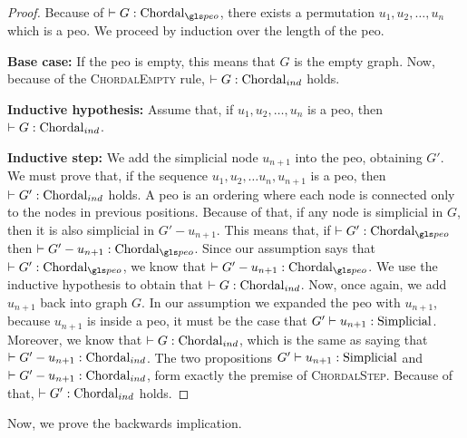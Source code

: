 \begin{proof}
    Because of $\chordalpeo{G}$, there exists a permutation $u_1, u_2, \dots, u_n$ which is a \gls{peo}. We proceed by induction over the length of the \gls{peo}.

    \medskip

    \textbf{Base case:}
    If the \gls{peo} is empty, this means that $G$ is the empty graph. Now, because of the \textsc{ChordalEmpty} rule, $\chordalind{G}$ holds.

    \medskip

    \textbf{Inductive hypothesis:}
    Assume that, if $u_1, u_2, \dots, u_n$ is a \gls{peo}, then $\chordalind{G}$.

    \medskip

    \textbf{Inductive step:}
    We add the simplicial node $u_{n+1}$ into the \gls{peo}, obtaining $G'$. We must prove that, if the sequence $u_1, u_2, \dots u_n, u_{n+1}$ is a \gls{peo}, then $\chordalind{G'}$ holds.
    A \gls{peo} is an ordering where each node is connected only to the nodes in previous positions. Because of that, if any node is simplicial in $G$, then it is also simplicial in $G' - u_{n+1}$. This means that, if $\chordalpeo{G'}$ then $\chordalpeo{G' - u_{n+1}}$. Since our assumption says that $\chordalpeo{G'}$, we know that $\chordalpeo{G' - u_{n+1}}$. We use the inductive hypothesis to obtain that $\chordalind{G}$. Now, once again, we add $u_{n+1}$ back into graph $G$. In our assumption we expanded the \gls{peo} with $u_{n+1}$, because $u_{n+1}$ is inside a \gls{peo}, it must be the case that $\simplicial{u_{n+1}}{G'}$. Moreover, we know that $\chordalind{G}$, which is the same as saying that $\chordalind{G' - u_{n+1}}$. The two propositions $\simplicial{u_{n+1}}{G'}$ and $\chordalind{G' - u_{n+1}}$, form exactly the premise of \textsc{ChordalStep}. Because of that, $\chordalind{G'}$ holds.
\end{proof}

Now, we prove the backwards implication.

